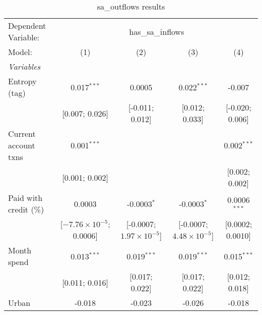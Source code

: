 
\begin{table}[htbp]
   \centering
   \tiny
   \begin{threeparttable}[b]
      \caption{\label{tab:reg_entropy_explore} sa\_outflows results}
      \begin{tabular}{lcccc}
         \tabularnewline \midrule \midrule
         Dependent Variable: & \multicolumn{4}{c}{has\_sa\_inflows}\\
         Model:                   & (1)                              & (2)                              & (3)                                            & (4)\\  
         \midrule
         \emph{Variables}\\
         Entropy (tag)            & 0.017$^{***}$                    & 0.0005                           & 0.022$^{***}$                                  & -0.007\\   
                                  & [0.007; 0.026]                   & [-0.011; 0.012]                  & [0.012; 0.033]                                 & [-0.020; 0.006]\\   
         Current account txns     & 0.001$^{***}$                    &                                  &                                                & 0.002$^{***}$\\   
                                  & [0.001; 0.002]                   &                                  &                                                & [0.002; 0.002]\\   
         Paid with credit (\%)    & 0.0003                           & -0.0003$^{*}$                    & -0.0003$^{*}$                                  & 0.0006$^{***}$\\   
                                  & [$-7.76\times 10^{-5}$; 0.0006]  & [-0.0007; $1.97\times 10^{-5}$]  & [-0.0007; $4.48\times 10^{-5}$]                & [0.0002; 0.0010]\\   
         Month spend              & 0.013$^{***}$                    & 0.019$^{***}$                    & 0.019$^{***}$                                  & 0.015$^{***}$\\   
                                  & [0.011; 0.016]                   & [0.017; 0.022]                   & [0.017; 0.022]                                 & [0.012; 0.018]\\   
         Urban                    & -0.018                           & -0.023                           & -0.026                                         & -0.018\\   

\end{tabular}
\end{threeparttable}
\end{table}
